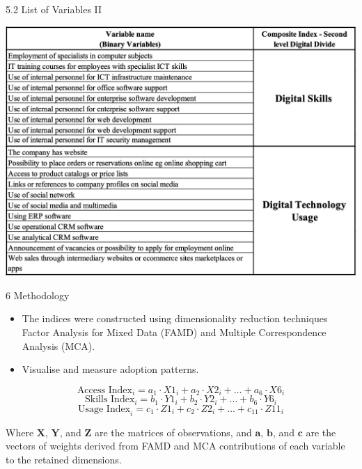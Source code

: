 \documentclass[
  ignorenonframetext,
]{beamer}
\providecommand{\tightlist}{%
  \setlength{\itemsep}{0pt}\setlength{\parskip}{0pt}}
\begin{document}
\begin{frame}{5.2 List of Variables II}
\label{list-of-variables-ii}
\begin{center}
\includegraphics[width=1\textwidth,height=0.7\textheight]{skills_usage_vars.png}
\end{center}
\end{frame}

\begin{frame}{6 Methodology}
\label{methodology}
\begin{itemize}
\tightlist
\item
  The indices were constructed using dimensionality reduction techniques
  Factor Analysis for Mixed Data (FAMD) and Multiple Correspondence
  Analysis (MCA).
\item
  Visualise and measure adoption patterns.
\end{itemize}

\[ \text{Access Index}_i = a_1 \cdot X1_i + a_2 \cdot X2_i + \ldots + a_6 \cdot X6_i \]
\[ \text{Skills Index}_i = b_1 \cdot Y1_i + b_2 \cdot Y2_i + \ldots + b_6 \cdot Y6_i \]
\[ \text{Usage Index}_i = c_1 \cdot Z1_i + c_2 \cdot Z2_i + \ldots + c_{11} \cdot Z11_i \]

Where \(\mathbf{X}\), \(\mathbf{Y}\), and \(\mathbf{Z}\) are the
matrices of observations, and \(\mathbf{a}\), \(\mathbf{b}\), and
\(\mathbf{c}\) are the vectors of weights derived from FAMD and MCA
contributions of each variable to the retained dimensions.
\end{frame}
\end{document}
